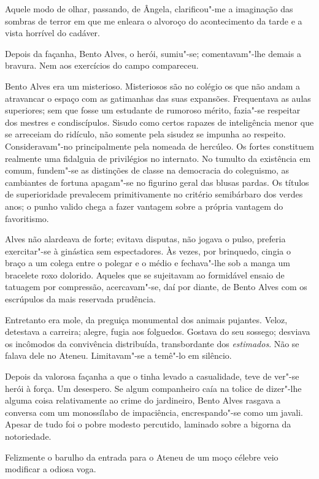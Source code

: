 Aquele modo de olhar,
passando, de Ângela, clarificou"-me a imaginação das sombras de terror
em que me enleara o alvoroço do acontecimento da tarde e a vista
horrível do cadáver. 

Depois da façanha, Bento Alves, o herói,
sumiu"-se; comentavam"-lhe demais a bravura. Nem aos exercícios do
campo compareceu. 

Bento Alves era um misterioso. Misteriosos são no
colégio os que não andam a atravancar o espaço com as gatimanhas das
suas expansões. Frequentava as aulas superiores; sem que fosse um
estudante de rumoroso mérito, fazia"-se respeitar dos mestres e
condiscípulos. Sisudo como certos rapazes de inteligência menor que se
arreceiam do ridículo, não somente pela sisudez se impunha ao respeito.
Consideravam"-no principalmente pela nomeada de hercúleo. Os fortes
constituem realmente uma fidalguia de privilégios no internato. No
tumulto da existência em comum, fundem"-se as distinções de classe na
democracia do coleguismo, as cambiantes de fortuna apagam"-se no
figurino geral das blusas pardas. Os títulos de superioridade
prevalecem primitivamente no critério semibárbaro dos verdes anos; o
punho valido chega a fazer vantagem sobre a própria vantagem do
favoritismo. 

Alves não alardeava de forte; evitava disputas, não jogava
o pulso, preferia exercitar"-se à ginástica sem espectadores. Às
vezes, por brinquedo, cingia o braço a um colega entre o polegar e o
médio e fechava"-lhe sob a manga um bracelete roxo dolorido. Aqueles
que se sujeitavam ao formidável ensaio de tatuagem por compressão,
acercavam"-se, daí por diante, de Bento Alves com os escrúpulos da
mais reservada prudência. 

Entretanto era mole, da preguiça monumental
dos animais pujantes. Veloz, detestava a carreira; alegre, fugia aos
folguedos. Gostava do seu sossego; desviava os incômodos da convivência
distribuída, transbordante dos \textit{estimados}. Não se falava dele no Ateneu.
Limitavam"-se a temê"-lo em silêncio. 

Depois da valorosa façanha a
que o tinha levado a casualidade, teve de ver"-se herói à força. Um
desespero. Se algum companheiro caía na tolice de dizer"-lhe alguma
coisa relativamente ao crime do jardineiro, Bento Alves rasgava a
conversa com um monossílabo de impaciência, encrespando"-se como um
javali. Apesar de tudo foi o pobre modesto percutido, laminado sobre a
bigorna da notoriedade. 

Felizmente o barulho da entrada para o Ateneu
de um moço célebre veio modificar a odiosa voga. 

